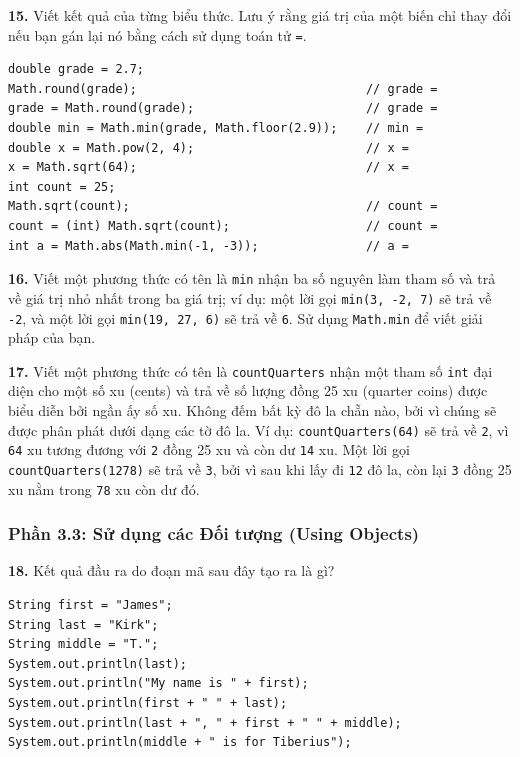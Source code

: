 \textbf{15.} Viết kết quả của từng biểu thức. Lưu ý rằng giá trị của một
biến chỉ thay đổi nếu bạn gán lại nó bằng cách sử dụng toán tử
\texttt{=}.

\begin{verbatim}
double grade = 2.7;
Math.round(grade);                                // grade =
grade = Math.round(grade);                        // grade =
double min = Math.min(grade, Math.floor(2.9));    // min =
double x = Math.pow(2, 4);                        // x =
x = Math.sqrt(64);                                // x =
int count = 25;
Math.sqrt(count);                                 // count =
count = (int) Math.sqrt(count);                   // count =
int a = Math.abs(Math.min(-1, -3));               // a =
\end{verbatim}

\textbf{16.} Viết một phương thức có tên là \texttt{min} nhận ba số
nguyên làm tham số và trả về giá trị nhỏ nhất trong ba giá trị; ví dụ:
một lời gọi \texttt{min(3,\ -2,\ 7)} sẽ trả về \texttt{-2}, và một lời
gọi \texttt{min(19,\ 27,\ 6)} sẽ trả về \texttt{6}. Sử dụng
\texttt{Math.min} để viết giải pháp của bạn.

\textbf{17.} Viết một phương thức có tên là \texttt{countQuarters} nhận
một tham số \texttt{int} đại diện cho một số xu (cents) và trả về số
lượng đồng 25 xu (quarter coins) được biểu diễn bởi ngần ấy số xu. Không
đếm bất kỳ đô la chẵn nào, bởi vì chúng sẽ được phân phát dưới dạng các
tờ đô la. Ví dụ: \texttt{countQuarters(64)} sẽ trả về \texttt{2}, vì
\texttt{64} xu tương đương với \texttt{2} đồng 25 xu và còn dư
\texttt{14} xu. Một lời gọi \texttt{countQuarters(1278)} sẽ trả về
\texttt{3}, bởi vì sau khi lấy đi \texttt{12} đô la, còn lại \texttt{3}
đồng 25 xu nằm trong \texttt{78} xu còn dư đó.

\subsubsection{Phần 3.3: Sử dụng các Đối tượng (Using
Objects)}\label{phux1ea7n-3.3-sux1eed-dux1ee5ng-cuxe1c-ux111ux1ed1i-tux1b0ux1ee3ng-using-objects}

\textbf{18.} Kết quả đầu ra do đoạn mã sau đây tạo ra là gì?

\begin{verbatim}
String first = "James";
String last = "Kirk";
String middle = "T.";
System.out.println(last);
System.out.println("My name is " + first);
System.out.println(first + " " + last);
System.out.println(last + ", " + first + " " + middle);
System.out.println(middle + " is for Tiberius");
\end{verbatim}

